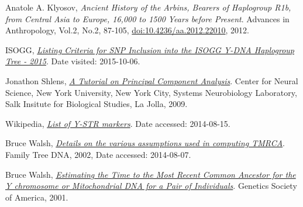 \begin{thebibliography}{bla}
 Anatole A. Klyosov,
\emph{Ancient History of the Arbins, Bearers of Haplogroup R1b, from
Central Asia to Europe, 16,000 to 1500 Years before Present}.
Advances in Anthropology, Vol.2, No.2, 87-105,
\href{http://dx.doi.org/10.4236/aa.2012.22010}{doi:10.4236/aa.2012.22010}, 2012.

 ISOGG,
\emph{\href{http://www.isogg.org/tree/ISOGG_SNP_Requirements.html}
{Listing Criteria for SNP Inclusion into the ISOGG Y-DNA Haplogroup Tree - 2015}}.
Date visited: 2015-10-06.

 Jonathon Shlens,
\emph{\href{http://rieke-server.physiol.washington.edu/People/Fred/Classes/545/shlens-pca.pdf}
{A Tutorial on Principal Component Analysis}}.
Center for Neural Science, New York University,
New York City, 
Systems Neurobiology Laboratory, Salk Insitute for Biological Studies,
La Jolla, 2009.

 Wikipedia,
\emph{\href{http://en.wikipedia.org/wiki/List_of_DYS_markers}
{List of Y-STR markers}}.
Date accessed: 2014-08-15.

 Bruce Walsh,
\emph{\href{http://nitro.biosci.arizona.edu/ftDNA/models.html}
{Details on the various assumptions used in computing TMRCA}}.
Family Tree DNA, 2002, Date accessed: 2014-08-07.

 Bruce Walsh,
\emph{\href{http://www.ncbi.nlm.nih.gov/pmc/articles/PMC1461668/}
{Estimating the Time to the Most Recent Common Ancestor for the
Y chromosome or Mitochondrial DNA for a Pair of Individuals}}.
Genetics Society of America, 2001.

\end{thebibliography}
